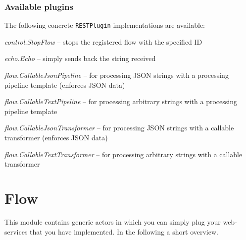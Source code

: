 \documentclass[a4paper]{book}
\begin{document}
\subsection{Available plugins}
The following concrete \verb|RESTPlugin| implementations are available:
\begin{tight_itemize}
  \item \textit{control.StopFlow} -- stops the registered flow with the specified ID
  \item \textit{echo.Echo} -- simply sends back the string received
  \item \textit{flow.CallableJsonPipeline} -- for processing JSON strings with a processing pipeline template (enforces JSON data)
  \item \textit{flow.CallableTextPipeline} -- for processing arbitrary strings with a processing pipeline template
  \item \textit{flow.CallableJsonTransformer} -- for processing JSON strings with a callable transformer (enforces JSON data)
  \item \textit{flow.CallableTextTransformer} -- for processing arbitrary strings with a callable transformer
\end{tight_itemize}


\chapter{Flow}
This module contains generic actors in which you can simply plug your 
web-services that you have implemented. In the following a short overview.
\end{document}
